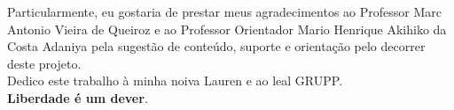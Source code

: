 \documentclass[article,12pt,oneside,a4paper,english,brazil]{unifil}
\begin{document}
\begin{Spacing}{1.5}
Particularmente, eu gostaria de prestar meus agradecimentos ao Professor Marc Antonio Vieira de Queiroz e ao Professor Orientador Mario Henrique Akihiko da Costa Adaniya pela sugestão de conteúdo, suporte e orientação pelo decorrer deste projeto.\\ Dedico este trabalho à minha noiva Lauren e ao leal GRUPP.\\ \textbf{Liberdade é um dever}.



\end{Spacing}
\postextual


\end{document}
